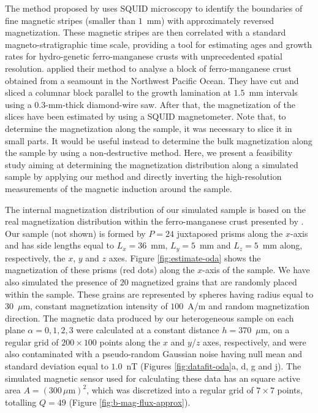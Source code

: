 \documentclass[galley,gc]{agutex}
\begin{document}
\begin{article}
The method proposed by \citet{oda2011} 
uses SQUID microscopy to identify the boundaries of fine magnetic stripes 
(smaller than $1$~mm) with approximately reversed magnetization. These magnetic stripes are 
then correlated with a standard magneto-stratigraphic time scale, providing a tool for 
estimating ages and growth rates for hydro-genetic ferro-manganese crusts with unprecedented 
spatial resolution.
\citet{oda2011} applied their method to analyse a block of ferro-manganese crust obtained 
from a seamount in the Northwest Pacific Ocean. They have cut and sliced a columnar block 
parallel to the growth lamination at $1.5$~mm intervals using a $0.3$-mm-thick diamond-wire 
saw. After that, the magnetization of the slices have been estimated by using a 
SQUID magnetometer.
Note that, to determine the magnetization along the sample, it was necessary to slice 
it in small parts. It would be useful instead to determine the bulk magnetization along 
the sample by using a non-destructive method.
Here, we present a feasibility study aiming at  
determining the magnetization distribution along a simulated sample
by applying our method and directly inverting the high-resolution measurements of 
the magnetic induction around the sample. 

The internal magnetization distribution of our simulated sample
is based on the real magnetization distribution within the
ferro-manganese crust presented by \citet{oda2011}.
Our sample (not shown) is formed by $P = 24$ juxtaposed prisms along the 
$x$-axis and has side 
lengths equal to $L_{x} = 36$~mm, $L_{y} = 5$~mm and $L_{z} = 5$~mm along, 
respectively, the $x$, $y$ and $z$ axes.
Figure \ref{fig:estimate-oda} shows the magnetization of these prisms 
(red dots) along the $x$-axis of the sample.
We have also simulated the presence of $20$ magnetized grains that 
are randomly placed within the sample.
These grains are represented by spheres having radius equal to $30$~$\mu$m,
constant magnetization intensity of $100$~A/m and random magnetization direction.
The magnetic data produced by our heterogeneous sample on 
each plane $\alpha = 0, 1, 2, 3$ were calculated at a
constant distance $h = 370$~$\mu$m, on
a regular grid of $200 \times 100$ points along the $x$ and 
$y$/$z$ axes, respectively, and were also contaminated with a 
pseudo-random Gaussian noise having null mean and standard 
deviation equal to $1.0$~nT (Figures \ref{fig:datafit-oda}a,
d, g and j).
The simulated magnetic sensor used for calculating these data 
has an square active area  
$A = (300 \, \mu \text{m})^{2}$, which was discretized into
a regular grid of $7 \times 7$ points, totalling $Q = 49$
(Figure \ref{fig:b-mag-flux-approx}).


\end{article}
\end{document}
